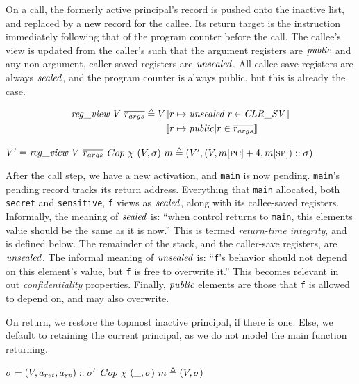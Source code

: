 \documentclass[10pt,conference]{ieeetran}%
\theoremstyle{definition}
\begin{document}
On a call, the formerly active principal's record is pushed onto the inactive list,
and replaced by a new record for the callee. Its return target is the instruction
immediately following that of the program counter before the call.
The callee's view is updated from the caller's such that the argument
registers are \(\mathit{public}\) and any non-argument, caller-saved registers
are \(\mathit{unsealed}\). All callee-save registers are always \(\mathit{sealed}\), and
the program counter is always public, but this is already the case.

\[\begin{split}
\mathit{reg\_view} ~ V ~ \overline{r_{args}} \triangleq
V & \llbracket r \mapsto \mathit{unsealed} | r \in \mathit{CLR\_SV} \rrbracket \\
& \llbracket r \mapsto \mathit{public} | r \in \overline{r_{args}} \rrbracket
\end{split}\]

            {\(V' = \mathit{reg\_view} ~ V ~ \overline{r_{args}}\)}
            {\(Cop ~ \chi ~ (V,\sigma) ~ m \triangleq
              (V',(V, m[\textsc{pc}]+4, m[\textsc{sp}])::\sigma)\)}

            
After the call step, we have a new activation, and {\tt main} is now pending.
{\tt main}'s pending record tracks its return address.
Everything that {\tt main} allocated, both {\tt secret} and {\tt sensitive},
{\tt f} views as \(\mathit{sealed}\), along with its callee-saved registers.
Informally, the meaning of \(\mathit{sealed}\) is: ``when control returns to
{\tt main}, this elements value should be the same as it is now.''
This is termed {\it return-time integrity}, and is defined below.
The remainder of the stack, and the caller-save registers, are \(\mathit{unsealed}\).
The informal meaning of \(\mathit{unsealed}\) is: ``{\tt f}'s behavior should not
depend on this element's value, but {\tt f} is free to overwrite it.''
This becomes relevant in out {\it confidentiality} properties.
Finally, \(\mathit{public}\) elements are those that {\tt f} is allowed to
depend on, and may also overwrite.

On return, we restore the topmost inactive principal, if there is one.
Else, we default to retaining the current principal, as we do not model
the main function returning.

            {\(\sigma = (V,a_{ret},a_{sp})::\sigma'\)}
            {\(Cop ~ \chi ~ (\_, \sigma) ~ m \triangleq
              (V, \sigma)\)}
\end{document}
